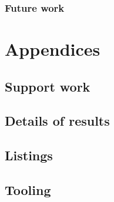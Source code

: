 \documentclass[
  oneside,
  11pt, a4paper,
  footinclude=true,
  headinclude=true,
  cleardoublepage=empty
]{scrbook}
\begin{document}
\section{Future work}
		
\cleardoublepage


\printindex
	
	\appendix
	\renewcommand\chaptername{Appendix}


\part{Appendices}

\chapter{Support work}

\chapter{Details of results}

\chapter{Listings}

\chapter{Tooling}

	
\begin{backcover}
\thispagestyle{empty} \pagecolor{white} \textcolor{black} {\selectfont ~\vfill
\noindent
%
\vfill ~}
\end{backcover}
\end{document}
